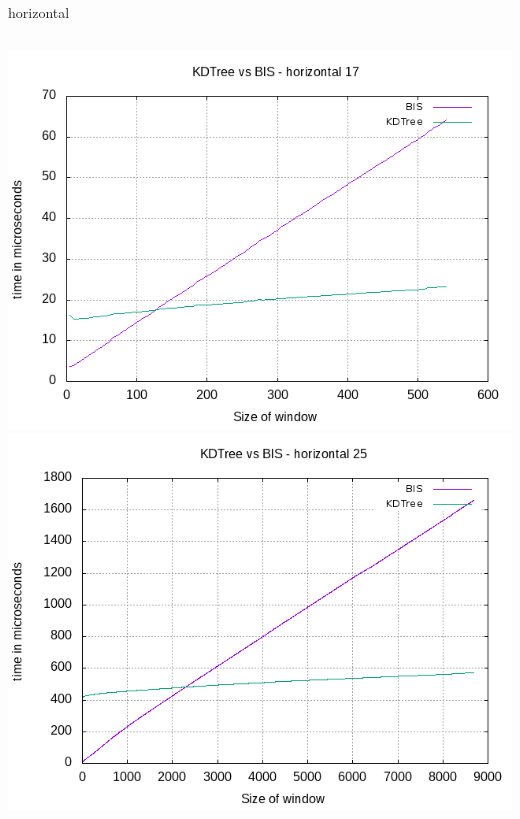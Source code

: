 \documentclass[pdf]{beamer}
\begin{document}
\begin{frame}{horizontal}
  \begin{columns}
    \includegraphics[scale=0.35]{pictures/analysis/hori_17.png}
    \includegraphics[scale=0.35]{pictures/analysis/hori_25.png}
  \end{columns}
\end{frame}
\end{document}
